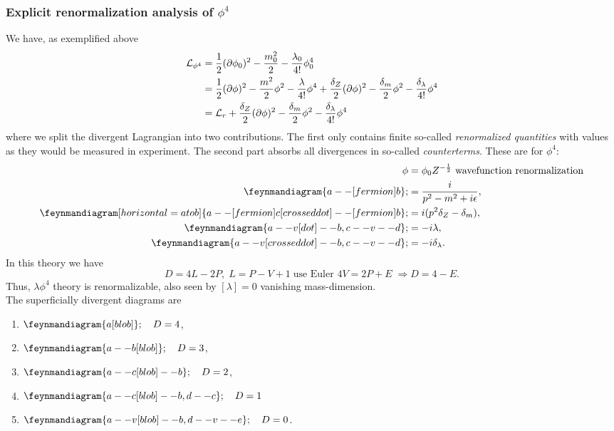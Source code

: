 \subsubsection{Explicit renormalization analysis of $\phi^4$}
\label{subsubsec:phifourrenormalization}
We have, as exemplified above
\begin{align*}
	\mathcal{L}_{\phi^4} &= \frac{1}{2} (\partial \phi_0)^2-\frac{m^2_0}{2} -\frac{\lambda_0}{4!} \phi^4_0 \\
	&= \frac{1}{2} (\partial \phi)^2-\frac{m^2}{2}\phi^2-\frac{\lambda}{4!}\phi^4 + \frac{\delta_Z}{2} (\partial \phi)^2 -\frac{\delta_m}{2} \phi^2 -\frac{\delta_\lambda}{4!} \phi^4\\
	&=\mathcal{L}_r +  \frac{\delta_Z}{2} (\partial \phi)^2 -\frac{\delta_m}{2} \phi^2 -\frac{\delta_\lambda}{4!} \phi^4 
\end{align*}
where we split the divergent Lagrangian into two contributions. The first only contains finite so-called \emph{renormalized quantities} with values as they would be measured in experiment. The second part absorbs all divergences in so-called \emph{counterterms}. These are for $\phi^4$:
\begin{align*}
	\phi &= \phi_0 Z^{-\half} \text{ wavefunction renormalization}\\
	\feynmandiagram{a--[fermion]b}; &= \frac{i}{p^2-m^2+i \epsilon},\\
	\feynmandiagram[horizontal=a to b]{a--[fermion] c [crossed dot] --[fermion] b};&= i (p^2 \delta_Z-\delta_m),\\
	\feynmandiagram{a--v[dot]--b, c--v--d};&=- i \lambda,\\
	\feynmandiagram{a--v[crossed dot] --b, c--v--d}; &=-i \delta_\lambda.
\end{align*}
In this theory we have
\begin{equation}
D=4L-2P,\; L=P-V+1 \; \text{use Euler } 4 V=2 P+E \; \Rightarrow D=4-E.
\end{equation}
Thus, $\lambda \phi^4$ theory is renormalizable, also seen by $[\lambda]=0$ vanishing mass-dimension.\\
The superficially divergent diagrams are
\begin{enumerate}
	\item $\feynmandiagram{a[blob]};\quad D=4$,
	\item $\feynmandiagram{a--b[blob]}; \quad D=3$,
	\item $\feynmandiagram{a--c[blob]--b};\quad D=2$,
	\item $\feynmandiagram{a--c[blob]--b, d--c}; \quad D=1$
	\item $\feynmandiagram{a--v[blob]--b, d--v--e};\quad D=0$.
\end{enumerate}
